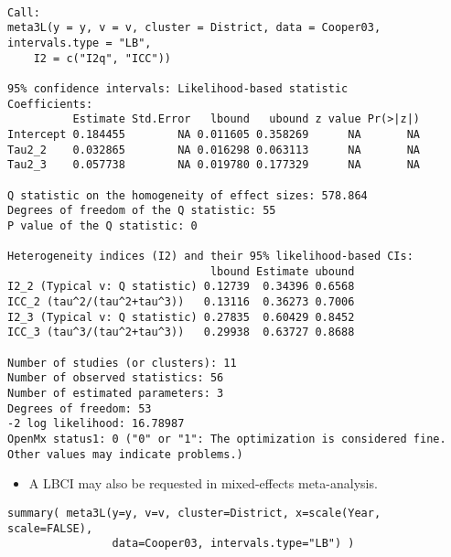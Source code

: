 \documentclass[11pt]{article}
\begin{document}
\begin{verbatim}

Call:
meta3L(y = y, v = v, cluster = District, data = Cooper03, intervals.type = "LB", 
    I2 = c("I2q", "ICC"))

95% confidence intervals: Likelihood-based statistic
Coefficients:
          Estimate Std.Error   lbound   ubound z value Pr(>|z|)
Intercept 0.184455        NA 0.011605 0.358269      NA       NA
Tau2_2    0.032865        NA 0.016298 0.063113      NA       NA
Tau2_3    0.057738        NA 0.019780 0.177329      NA       NA

Q statistic on the homogeneity of effect sizes: 578.864
Degrees of freedom of the Q statistic: 55
P value of the Q statistic: 0

Heterogeneity indices (I2) and their 95% likelihood-based CIs:
                               lbound Estimate ubound
I2_2 (Typical v: Q statistic) 0.12739  0.34396 0.6568
ICC_2 (tau^2/(tau^2+tau^3))   0.13116  0.36273 0.7006
I2_3 (Typical v: Q statistic) 0.27835  0.60429 0.8452
ICC_3 (tau^3/(tau^2+tau^3))   0.29938  0.63727 0.8688

Number of studies (or clusters): 11
Number of observed statistics: 56
Number of estimated parameters: 3
Degrees of freedom: 53
-2 log likelihood: 16.78987 
OpenMx status1: 0 ("0" or "1": The optimization is considered fine.
Other values may indicate problems.)
\end{verbatim}

\begin{itemize}
\item A LBCI may also be requested in mixed-effects meta-analysis.
\end{itemize}
\begin{verbatim}
summary( meta3L(y=y, v=v, cluster=District, x=scale(Year, scale=FALSE), 
                data=Cooper03, intervals.type="LB") ) 
\end{verbatim}
\end{document}
